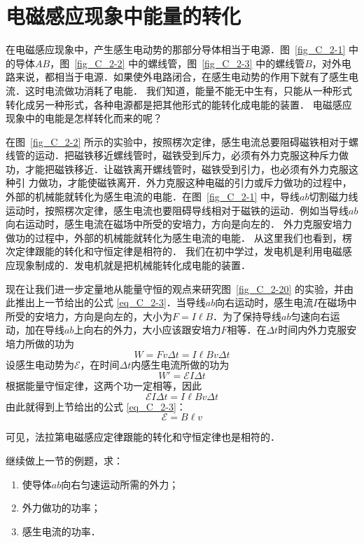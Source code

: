 \section{电磁感应现象中能量的转化}

在电磁感应现象中，产生感生电动势的那部分导体相当于电源．图~\ref{fig_C_2-1} 中的导体$AB$，图~\ref{fig_C_2-2} 中的螺线管，图~\ref{fig_C_2-3} 中的螺线管$B$，对外电路来说，都相当于电源．如果使外电路闭合，在感生电动势的作用下就有了感生电流．这时电流做功消耗了电能．
我们知道，能量不能无中生有，只能从一种形式转化成另一种形式，各种电源都是把其他形式的能转化成电能的装置．
电磁感应现象中的电能是怎样转化而来的呢？

在图~\ref{fig_C_2-2} 所示的实验中，按照楞次定律，感生电流总要阻碍磁铁相对于螺线管的运动．把磁铁移近螺线管时，磁铁受到斥力，必须有外力克服这种斥力做功，才能把磁铁移近．让磁铁离开螺线管时，磁铁受到引力，也必须有外力克服这种引
力做功，才能使磁铁离开．外力克服这种电磁的引力或斥力做功的过程中，外部的机械能就转化为感生电流的电能．在图~\ref{fig_C_2-1} 中，导线$ab$切割磁力线运动时，按照楞次定律，感生电流也要阻碍导线相对于磁铁的运动．例如当导线$ab$向右运动时，感生电流在磁场中所受的安培力，方向是向左的．
外力克服安培力做功的过程中，外部的机械能就转化为感生电流的电能．
从这里我们也看到，楞次定律跟能的转化和守恒定律是相符的．
我们在初中学过，发电机是利用电磁感应现象制成的．发电机就是把机械能转化成电能的装置．

现在让我们进一步定量地从能量守恒的观点来研究图~\ref{fig_C_2-20} 的实验，并由此推出上一节给出的公式 \eqref{eq_C_2-3}．当导线$ab$向右运动时，感生电流$I$在磁场中所受的安培力，方向是向左的，大小为$F=I\ell B$．为了保持导线$ab$匀速向右运动，加在导线$ab$上向右的外力，大小应该跟安培力$F$相等．在$\Delta t$时间内外力克服安培力所做的功为
\[W=Fv\Delta t=I\ell Bv\Delta t\]
设感生电动势为$\mathcal{E}$，在时间$\Delta t$内感生电流所做的功为
\[W'=\mathcal{E}I\Delta t\]
根据能量守恒定律，这两个功一定相等，因此
\[\mathcal{E}I\Delta t=I\ell B v \Delta t\]
由此就得到上节给出的公式 \eqref{eq_C_2-3}：
\[\mathcal{E}=B\ell v\]

可见，法拉第电磁感应定律跟能的转化和守恒定律也是相符的．

\begin{example}
继续做上一节的例题，求：
\begin{enumerate}
    \item 使导体$ab$向右匀速运动所需的外力；
    \item 外力做功的功率；
    \item 感生电流的功率．
\end{enumerate}
\end{example}

